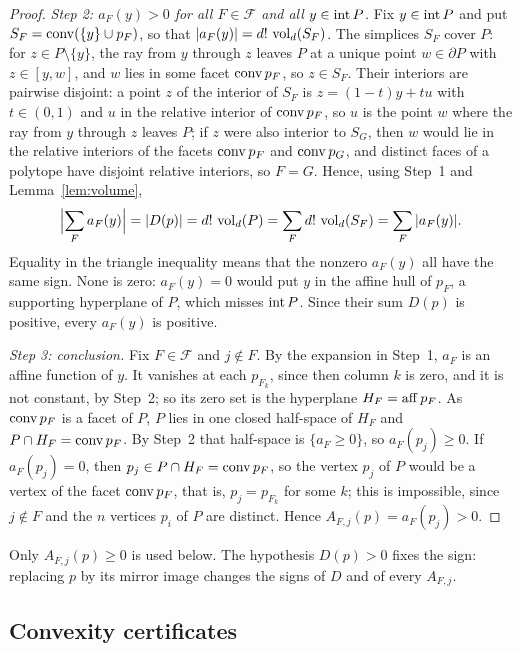 \begin{proof}
  \emph{Step 2: $a_{F}(y) > 0$ for all $F \in \mathcal{F}$ and all
  $y \in \operatorname{int} P$.} Fix $y \in \operatorname{int} P$ and put
  $S_{F} = \operatorname{conv}(\{y\} \cup p_{F})$, so that $|a_{F}(y)| = d!\,\operatorname{vol}_{d}(S_{F})$.
  The simplices $S_{F}$ cover $P$: for $z \in P \setminus \{y\}$, the ray from
  $y$ through $z$ leaves $P$ at a unique point $w \in \partial P$ with
  $z \in [y, w]$, and $w$ lies in some facet $\operatorname{conv} p_{F}$, so $z \in S_{F}$.
  Their interiors are pairwise disjoint: a point $z$ of the interior of
  $S_{F}$ is $z = (1 - t)y + tu$ with $t \in (0, 1)$ and $u$ in the relative
  interior of $\operatorname{conv} p_{F}$, so $u$ is the point $w$ where the ray from $y$
  through $z$ leaves $P$; if $z$ were also interior to $S_{G}$, then $w$
  would lie in the relative interiors of the facets $\operatorname{conv} p_{F}$ and
  $\operatorname{conv} p_{G}$, and distinct faces of a polytope have disjoint relative
  interiors, so $F = G$. Hence, using Step~1 and Lemma~\ref{lem:volume},
  \[
    \Bigl|\sum_{F} a_{F}(y)\Bigr| = |D(p)| = d!\,\operatorname{vol}_{d}(P)
    = \sum_{F} d!\,\operatorname{vol}_{d}(S_{F}) = \sum_{F} |a_{F}(y)|.
  \]
  Equality in the triangle inequality means that the nonzero $a_{F}(y)$
  all have the same sign. None is zero: $a_{F}(y) = 0$ would put $y$ in the
  affine hull of $p_{F}$, a supporting hyperplane of $P$, which misses
  $\operatorname{int} P$. Since their sum $D(p)$ is positive, every $a_{F}(y)$ is
  positive.

  \emph{Step 3: conclusion.} Fix $F \in \mathcal{F}$ and $j \notin F$. By the
  expansion in Step~1, $a_{F}$ is an affine function of $y$. It vanishes at
  each $p_{F_{k}}$, since then column $k$ is zero, and it is not constant, by
  Step~2; so its zero set is the hyperplane $H_{F} = \operatorname{aff} p_{F}$. As
  $\operatorname{conv} p_{F}$ is a facet of $P$, $P$ lies in one closed half-space of
  $H_{F}$ and $P \cap H_{F} = \operatorname{conv} p_{F}$. By Step~2 that half-space is
  $\{a_{F} \geq 0\}$, so $a_{F}(p_{j}) \geq 0$. If $a_{F}(p_{j}) = 0$, then
  $p_{j} \in P \cap H_{F} = \operatorname{conv} p_{F}$, so the vertex $p_{j}$ of $P$
  would be a vertex of the facet $\operatorname{conv} p_{F}$, that is, $p_{j} = p_{F_{k}}$
  for some $k$; this is impossible, since $j \notin F$ and the $n$ vertices
  $p_{i}$ of $P$ are distinct. Hence $A_{F,j}(p) = a_{F}(p_{j}) > 0$.
\end{proof}

Only $A_{F,j}(p) \geq 0$ is used below. The hypothesis $D(p) > 0$ fixes the
sign: replacing $p$ by its mirror image changes the signs of $D$ and of
every $A_{F,j}$.

\subsection{Convexity certificates}

